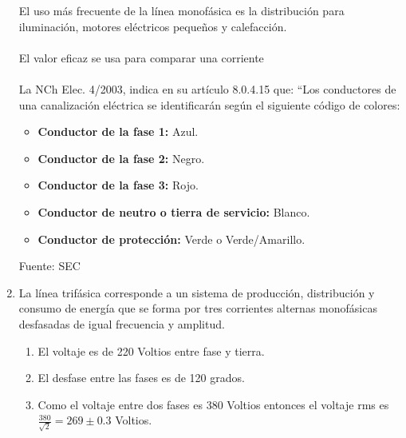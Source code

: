 \begin{enumerate}
 El uso más frecuente de la línea monofásica es la distribución para iluminación, motores eléctricos pequeños y calefacción.
\\ \\
El valor eficaz se usa para comparar una corriente 
\\ \\
La NCh Elec. 4/2003, indica en su artículo 8.0.4.15 que: “Los conductores de una canalización eléctrica se identificarán según el siguiente código de colores:
    \begin{itemize}
        \item \textbf{Conductor de la fase 1:} Azul.
        \item \textbf{Conductor de la fase 2:} Negro.
        \item \textbf{Conductor de la fase 3:} Rojo.
        \item \textbf{Conductor de neutro o tierra de servicio:} Blanco.
        \item \textbf{Conductor de protección:} Verde o Verde/Amarillo.
    \end{itemize}
Fuente: SEC

\item %
La línea trifásica corresponde a un sistema de producción, distribución y consumo de energía que se forma por tres corrientes alternas monofásicas desfasadas de igual frecuencia y amplitud.
\begin{enumerate}
    \item El voltaje es de 220 Voltios entre fase y tierra. 
    \item El desfase entre las fases es de 120 grados. 
    \item Como el voltaje entre dos fases es 380 Voltios entonces el voltaje rms es $\frac{380}{\sqrt{2}} = 269 \pm 0.3 $ Voltios. 
\end{enumerate}
\newpage


\end{enumerate}
